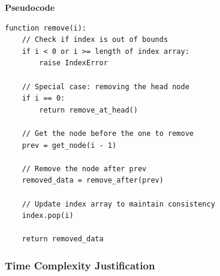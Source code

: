 \documentclass[12pt]{article}
\begin{document}
\textbf{Pseudocode}

\begin{lstlisting}
function remove(i):
    // Check if index is out of bounds
    if i < 0 or i >= length of index array:
        raise IndexError

    // Special case: removing the head node
    if i == 0:
        return remove_at_head()

    // Get the node before the one to remove
    prev = get_node(i - 1)

    // Remove the node after prev
    removed_data = remove_after(prev)

    // Update index array to maintain consistency
    index.pop(i)

    return removed_data
\end{lstlisting}

\newpage
\subsubsection{Time Complexity Justification}
\end{document}
